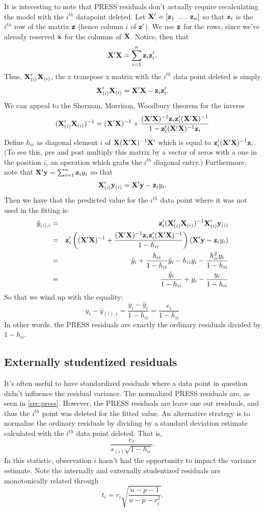 It is interesting to note that PRESS residuals don't actually require recalculating the
model with the $i^{th}$ datapoint deleted. Let $\mathbf{X}' = [\mathbf{z}_1 ~ \ldots ~ \mathbf{z}_n]$
so that $\mathbf{z}_i$ is the $i^{th}$ row of the matrix $\mathbf{z}$ (hence column $i$ of $\mathbf{z}'$). 
We use $\mathbf{z}$ for the rows, since we've already reserved $\mathbf{x}$ for the columns of $\mathbf{X}$. 
Notice, then that 
$$
\mathbf{X}' \mathbf{X} = \sum_{i=1}^n \mathbf{z}_i \mathbf{z}_i'.
$$
Thus, $\mathbf{X}_{(i)}' \mathbf{X}_{(i)}$, the x transpose x matrix with the $i^{th}$ data
point deleted is simply
$$
\mathbf{X}_{(i)}' \mathbf{X}_{(i)} = \mathbf{X}' \mathbf{X} - \mathbf{z}_i \mathbf{z}_i'.
$$
We can appeal to the Sherman, Morrison, Woodbury theorem for the inverse
$$
(\mathbf{X}_{(i)}' \mathbf{X}_{(i)})^{-1}
= (\mathbf{X}' \mathbf{X})^{-1} + \frac{(\mathbf{X}' \mathbf{X})^{-1} \mathbf{z}_i \mathbf{z}_i' (\mathbf{X}' \mathbf{X})^{-1}}{1 - \mathbf{z}_i' (\mathbf{X}' \mathbf{X})^{-1} \mathbf{z}_i}
$$
Define $h_{ii}$ as diagonal element $i$ of $\mathbf{X} (\mathbf{X}' \mathbf{X})^{-1} \mathbf{X}'$ which is equal to
$\mathbf{z}_i' (\mathbf{X}' \mathbf{X})^{-1} \mathbf{z}_i$. (To see this, pre and post multiply this matrix by a 
vector of zeros with a one in the position $i$, an operation which grabs the $i^{th}$ diagonal entry.)
Furthermore, note that $\mathbf{X}' \mathbf{y} = \sum_{i=1}^n \mathbf{z}_i y_i$ so that
$$
\mathbf{X}_{(i)}' \mathbf{y}_{(i)} = \mathbf{X}' \mathbf{y} - \mathbf{z}_i y_i.
$$
Then we have that the predicted value for the $i^{th}$ data point where it was not used in the fitting is:
\begin{eqnarray*}
\hat y_{(i),i} & = & \mathbf{z}_i' (\mathbf{X}_{(i)}' \mathbf{X}_{(i)})^{-1} \mathbf{X}_{(i)}' \mathbf{y}_{(i)}\\
& = & \mathbf{z}_i' \left((\mathbf{X}' \mathbf{X})^{-1} + \frac{(\mathbf{X}' \mathbf{X})^{-1} \mathbf{z}_i \mathbf{z}_i' (\mathbf{X}' \mathbf{X})^{-1}}{1 - h_{ii}} \right)(\mathbf{X}' \mathbf{y} - \mathbf{z}_i y_i) \\
& = & \hat y_i + \frac{h_{ii}}{1 - h_{ii}} \hat y_i - h_{ii} y_i - \frac{h_{ii}^2 y_i}{1 - h_{ii}} \\
& = & \frac{\hat y_i}{1 - h_{ii}} + y_i - \frac{y_i}{1 - h_{ii}}
\end{eqnarray*}
So that we wind up with the equality: 
$$
y_i - \hat y_{(i), i} = \frac{y_i - \hat y_i}{1 - h_{ii}} = \frac{e_i}{1 - h_{ii}}
$$
In other words, the PRESS residuals are exactly the ordinary residuals divided by $1 - h_{ii}$. 

\subsection{Externally studentized residuals}
It's often useful to have standardized residuals where a data point in question didn't
influence the residual variance. The normalized
PRESS residuals are, as seen in \ref{sec:press}.  However, the PRESS residuals are 
leave one out residuals, and thus the $i^{th}$ point was deleted for the fitted value. An alternative
strategy is to normalize the ordinary residuals by dividing by a standard deviation estimate
calculated with the $i^{th}$ data point deleted. That is,
$$
\frac{e_i}{s_{(i)}\sqrt{1 - h_{ii}}}.
$$
In this statistic, observation $i$ hasn't had the opportunity to impact the variance estimate.
Note the internally and externally studentized residuals are monotonically
related through
$$t_i = r_i \sqrt{\frac{n-p-1}{n-p-r_i^2}}.$$

